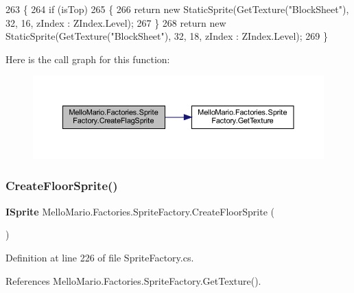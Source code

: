 \begin{DoxyCode}
263         \{
264             \textcolor{keywordflow}{if} (isTop)
265             \{
266                 \textcolor{keywordflow}{return} \textcolor{keyword}{new} StaticSprite(GetTexture(\textcolor{stringliteral}{"BlockSheet"}), 32, 16, zIndex : 
      ZIndex.Level);
267             \}
268             \textcolor{keywordflow}{return} \textcolor{keyword}{new} StaticSprite(GetTexture(\textcolor{stringliteral}{"BlockSheet"}), 32, 18, zIndex : 
      ZIndex.Level);
269         \}
\end{DoxyCode}
Here is the call graph for this function\+:
\nopagebreak
\begin{figure}[H]
\begin{center}
\leavevmode
\includegraphics[width=350pt]{classMelloMario_1_1Factories_1_1SpriteFactory_a2324945ad4d8e3cd9d8d58abd2455148_cgraph}
\end{center}
\end{figure}
\mbox{\label{classMelloMario_1_1Factories_1_1SpriteFactory_a6797aa2f76dd8986f7b8bc49f6e8e96f}} 
\subsubsection{Create\+Floor\+Sprite()}
{\footnotesize\ttfamily \textbf{ I\+Sprite} Mello\+Mario.\+Factories.\+Sprite\+Factory.\+Create\+Floor\+Sprite (\begin{DoxyParamCaption}{ }\end{DoxyParamCaption})}



Definition at line 226 of file Sprite\+Factory.\+cs.



References Mello\+Mario.\+Factories.\+Sprite\+Factory.\+Get\+Texture().


